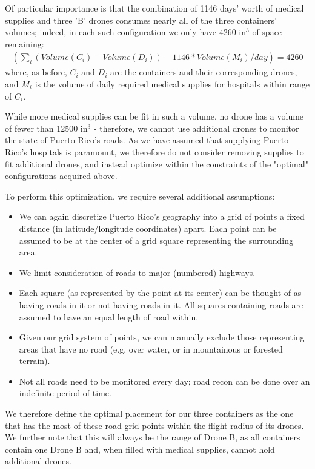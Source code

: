 Of particular importance is that the combination of 1146 days' worth of medical supplies and three 'B' drones consumes nearly all of the three containers' volumes; indeed, in each such configuration we only have 4260 in$^3$ of space remaining:
\begin{align*}
   (\sum_i (Volume (C_i) - Volume (D_i)) - 1146 * Volume(M_i)/day) = 4260
\end{align*}
where, as before, $C_i$ and $D_i$ are the containers and their corresponding drones, and $M_i$ is the volume of daily required medical supplies for hospitals within range of $C_i$.  

While more medical supplies can be fit in such a volume, no drone has a volume of fewer than 12500 in$^3$ - therefore, we cannot use additional drones to monitor the state of Puerto Rico's roads. As we have assumed that supplying Puerto Rico's hospitals is paramount, we therefore do not consider removing supplies to fit additional drones, and instead optimize within the constraints of the "optimal" configurations acquired above.  

To perform this optimization, we require several additional assumptions:
\begin{itemize}
\item We can again discretize Puerto Rico's geography into a grid of points a fixed distance (in latitude/longitude coordinates) apart. Each point can be assumed to be at the center of a grid square representing the surrounding area.
\item We limit consideration of roads to major (numbered) highways.
\item Each square (as represented by the point at its center) can be thought of as having roads in it or not having roads in it. All squares containing roads are assumed to have an equal length of road within.
\item Given our grid system of points, we can manually exclude those representing areas that have no road (e.g. over water, or in mountainous or forested terrain). 
\item Not all roads need to be monitored every day; road recon can be done over an indefinite period of time.
\end{itemize}  

We therefore define the optimal placement for our three containers as the one that has the most of these road grid points within the flight radius of its drones. We further note that this will always be the range of Drone B, as all containers contain one Drone B and, when filled with medical supplies, cannot hold additional drones.  

